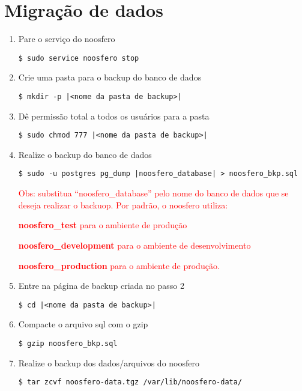 
\chapter{Migração de dados}
\begin{enumerate}
\item Pare o serviço do noosfero
\begin{lstlisting}
$ sudo service noosfero stop
\end{lstlisting}
\item Crie uma pasta para o backup  do banco de dados
\begin{lstlisting}[style=base]
$ mkdir -p |<nome da pasta de backup>|
\end{lstlisting}
\item Dê permissão total a todos os usuários para a pasta 
\begin{lstlisting}[style=base]
$ sudo chmod 777 |<nome da pasta de backup>|
\end{lstlisting}
\item Realize o backup do banco de dados
\begin{lstlisting}[style=base]
$ sudo -u postgres pg_dump |noosfero_database| > noosfero_bkp.sql
\end{lstlisting}

\textcolor{red}{{\scriptsize Obs: substitua  “noosfero\_database” pelo nome do banco de dados que se deseja realizar o backuop. Por padrão, o noosfero utiliza: }}

\textcolor{red}{{\scriptsize \textbf{noosfero\_test} para o ambiente de produção}}

\textcolor{red}{{\scriptsize \textbf{noosfero\_development} para o ambiente de desenvolvimento }}

\textcolor{red}{{\scriptsize \textbf{noosfero\_production} para o ambiente de produção.}}

\item Entre na página de backup criada no passo 2
\begin{lstlisting}[style=base]
$ cd |<nome da pasta de backup>|
\end{lstlisting}

\item Compacte o arquivo sql com o gzip
\begin{lstlisting}
$ gzip noosfero_bkp.sql
\end{lstlisting}

\item Realize o backup dos dados/arquivos do noosfero
\begin{lstlisting}
$ tar zcvf noosfero-data.tgz /var/lib/noosfero-data/
\end{lstlisting}


\end{enumerate}
